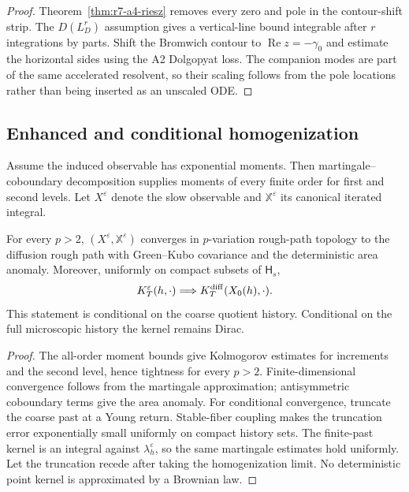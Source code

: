 \begin{proof}
Theorem~\ref{thm:r7-a4-riesz} removes every zero and pole in the contour-shift
strip.  The $D(L_D^r)$ assumption gives a vertical-line bound integrable after
$r$ integrations by parts.  Shift the Bromwich contour to
$\operatorname{Re}z=-\gamma_0$ and estimate the horizontal sides using the A2
Dolgopyat loss.  The companion modes are part of the same accelerated
resolvent, so their scaling follows from the pole locations rather than being
inserted as an unscaled ODE.
\end{proof}

\subsection{Enhanced and conditional homogenization}

Assume the induced observable has exponential moments.  Then martingale--coboundary
decomposition supplies moments of every finite order for first and second
levels.  Let $X^\varepsilon$ denote the slow observable and
$\mathbb X^\varepsilon$ its canonical iterated integral.

\begin{theorem}
\label{thm:r7-a4-rough}
For every $p>2$,
$(X^\varepsilon,\mathbb X^\varepsilon)$ converges in $p$-variation rough-path
topology to the diffusion rough path with Green--Kubo covariance and the
deterministic area anomaly.  Moreover, uniformly on compact subsets of
$\mathsf H_s$,
\[
 K_T^\varepsilon(h,\cdot)\Longrightarrow
 K_T^{\rm diff}(X_0(h),\cdot).
\]
This statement is conditional on the coarse quotient history.  Conditional on
the full microscopic history the kernel remains Dirac.
\end{theorem}

\begin{proof}
The all-order moment bounds give Kolmogorov estimates for increments and the
second level, hence tightness for every $p>2$.  Finite-dimensional convergence
follows from the martingale approximation; antisymmetric coboundary terms give
the area anomaly.  For conditional convergence, truncate the coarse past at a
Young return.  Stable-fiber coupling makes the truncation error exponentially
small uniformly on compact history sets.  The finite-past kernel is an
integral against $\lambda_h^\varepsilon$, so the same martingale estimates hold
uniformly.  Let the truncation recede after taking the homogenization limit.
No deterministic point kernel is approximated by a Brownian law.
\end{proof}

